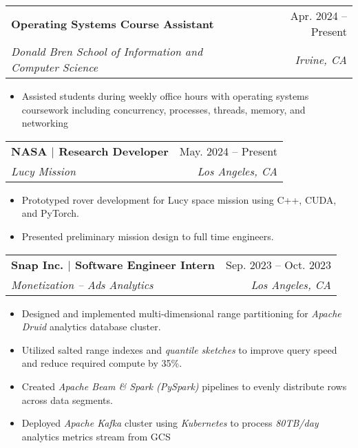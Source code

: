 \documentclass[letterpaper,11pt]{article}
\makeatletter
\newcommand{\resumeItem}[1]{
  \item\small{
    {#1 \vspace{-2pt}}
  }
}
\newcommand{\resumeSubheading}[4]{
  \vspace{-2pt}\item
    \begin{tabular*}{0.97\textwidth}[t]{l@{\extracolsep{\fill}}r}
      \textbf{#1} & #2 \\
      \textit{#3} & \textit{#4} \\
    \end{tabular*}\vspace{-7pt}
}
\newcommand{\resumeItemListStart}{\begin{itemize}}
\newcommand{\resumeItemListEnd}{\end{itemize}\vspace{-5pt}}
\makeatother
\begin{document}
    \resumeSubheading
        {Operating Systems Course Assistant}{Apr. 2024 -- Present}
        {Donald Bren School of Information and Computer Science}{Irvine, CA}
        \resumeItemListStart
          \resumeItem{Assisted students during weekly office hours with operating systems coursework including concurrency, processes, threads, memory, and networking}
      \resumeItemListEnd

    \resumeSubheading
        {NASA $|$ Research Developer}{May. 2024 -- Present}
        {Lucy Mission}{Los Angeles, CA}
        \resumeItemListStart
            \resumeItem{Prototyped rover development for Lucy space mission using C++, CUDA, and PyTorch.}
            \resumeItem{Presented preliminary mission design to full time engineers.}
        \resumeItemListEnd

    \resumeSubheading
      {Snap Inc. $|$ Software Engineer Intern}{Sep. 2023 -- Oct. 2023}
      {Monetization -- Ads Analytics}{Los Angeles, CA}
      \resumeItemListStart
        \resumeItem{Designed and implemented multi-dimensional range partitioning for \textit{Apache Druid} analytics database cluster.}
        \resumeItem{Utilized salted range indexes and \textit{quantile sketches} to improve query speed and reduce required compute by 35\%.}
        \resumeItem{Created \textit{Apache Beam \& Spark (PySpark)} pipelines to evenly distribute rows across data segments.}
        \resumeItem{Deployed \textit{Apache Kafka} cluster using \textit{Kubernetes} to process \textit{80TB/day} analytics metrics stream from GCS}


        
        
      \resumeItemListEnd

        
\end{document}
